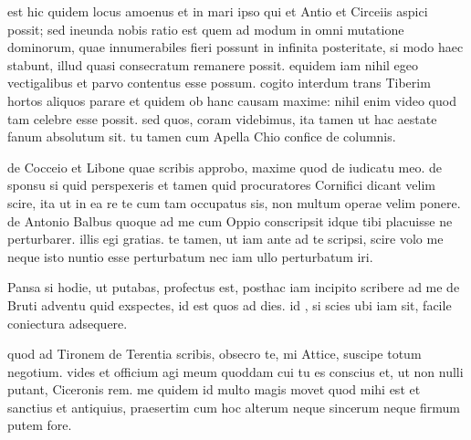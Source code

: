 


 est hic quidem locus amoenus et in mari ipso qui et Antio et Circeiis aspici possit; sed ineunda nobis ratio est quem ad modum in omni mutatione dominorum, quae innumerabiles fieri possunt in infinita posteritate, si modo haec stabunt, illud quasi consecratum remanere possit. equidem iam nihil egeo vectigalibus et parvo contentus esse possum. cogito interdum trans Tiberim hortos aliquos parare et quidem ob hanc causam maxime: nihil enim video quod tam celebre esse possit. sed quos, coram videbimus, ita tamen ut hac aestate fanum absolutum sit. tu tamen cum Apella Chio confice de columnis.

 de Cocceio et Libone quae scribis approbo, maxime quod de iudicatu meo. de sponsu si quid perspexeris et tamen quid procuratores Cornifici dicant velim scire, ita ut in ea re te cum tam occupatus sis, non multum operae velim ponere. de Antonio Balbus quoque ad me cum Oppio conscripsit idque tibi placuisse ne perturbarer. illis egi gratias. te tamen, ut iam ante ad te scripsi, scire volo me neque isto nuntio esse perturbatum nec iam ullo perturbatum iri.

 Pansa si hodie, ut putabas, profectus est, posthac iam incipito scribere ad me de Bruti adventu quid exspectes, id est quos ad dies. id , si scies ubi iam sit, facile coniectura adsequere.

 quod ad Tironem de Terentia scribis, obsecro te, mi Attice, suscipe totum negotium. vides et officium agi meum quoddam cui tu es conscius et, ut non nulli putant, Ciceronis rem. me quidem id multo magis movet quod mihi est et sanctius et antiquius, praesertim cum hoc alterum neque sincerum neque firmum putem fore.
